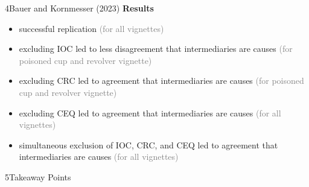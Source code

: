 \documentclass[xcolor=table,9pt,aspectratio=169]{beamer}
\begin{document}
\begin{frame}{\vspace*{10mm}4\hspace*{1em}Bauer and Kornmesser (2023)}
\vspace*{-5mm}
\textbf{Results}\\
\begin{itemize}
   \item successful replication \textcolor{gray}{(for all vignettes)}
   \item excluding IOC led to less disagreement that intermediaries are causes \textcolor{gray}{(for poisoned cup and revolver vignette)}
   \item excluding CRC led to agreement that intermediaries are causes \textcolor{gray}{(for poisoned cup and revolver vignette)}
   \item excluding CEQ led to agreement that intermediaries are causes \textcolor{gray}{(for all vignettes)}
   \item simultaneous exclusion of IOC, CRC, and CEQ led to agreement that intermediaries are causes \textcolor{gray}{(for all vignettes)}
\end{itemize}
\end{frame}


\begin{frame}
\begin{overlayarea}{\textwidth}{0.81\paperheight}{
   \vspace*{11mm}
   \textcolor{uolblue}
   {5\hspace*{1em}Takeaway Points}
}
\end{overlayarea}
\end{frame}
\end{document}
